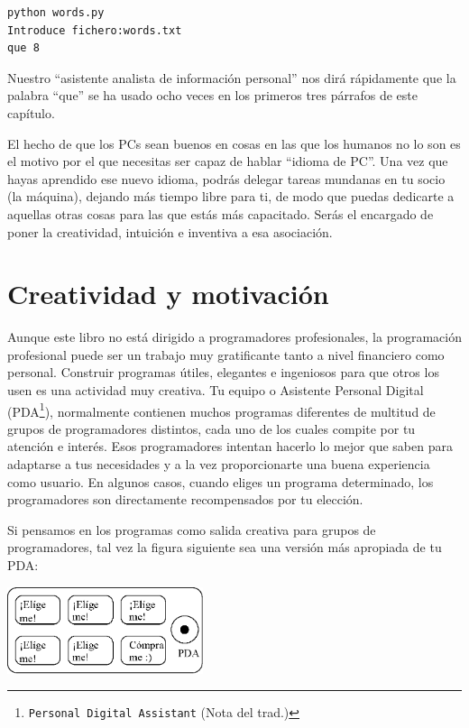 \beforeverb
\begin{verbatim}
python words.py
Introduce fichero:words.txt
que 8
\end{verbatim}
\afterverb
%
Nuestro ``asistente analista de información personal'' nos dirá
rápidamente que la palabra ``que'' se ha usado ocho veces en los
primeros tres párrafos de este capítulo.

El hecho de que los PCs sean buenos en cosas
en las que los humanos no lo son es el motivo por el que necesitas
ser capaz de hablar ``idioma de PC''. Una vez que hayas
aprendido ese nuevo idioma, podrás delegar tareas mundanas
en tu socio (la máquina), dejando más tiempo libre
para ti, de modo que puedas dedicarte a aquellas otras cosas
para las que estás más capacitado. Serás el encargado
de poner la creatividad, intuición e inventiva a esa
asociación.

\section{Creatividad y motivación}

Aunque este libro no está dirigido a programadores profesionales, la programación
profesional puede ser un trabajo muy gratificante tanto a nivel financiero como personal.
Construir programas útiles, elegantes e ingeniosos para que otros los usen
es una actividad muy creativa. Tu equipo o Asistente Personal Digital
(PDA\footnote{{\tt Personal Digital Assistant} (Nota del trad.)}),
normalmente contienen muchos programas diferentes de multitud de grupos de programadores
distintos, cada uno de los cuales compite por tu atención e interés.
Esos programadores intentan hacerlo lo mejor que saben para adaptarse a tus necesidades y
a la vez proporcionarte una buena experiencia como usuario. En algunos casos, cuando eliges un
programa determinado, los programadores son directamente recompensados por tu elección.

Si pensamos en los programas como salida creativa para grupos de programadores,
tal vez la figura siguiente sea una versión más apropiada de tu PDA:

\beforefig
\centerline{\includegraphics[height=1.00in]{figs2/pda2.eps}}
\afterfig

